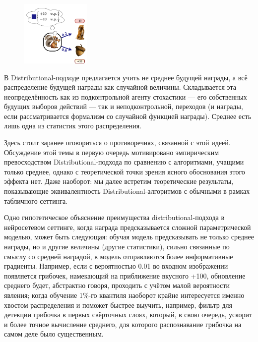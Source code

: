 \begin{figure}
\vspace{-0.3cm}
\centering
\includegraphics[width=0.3\textwidth]{Images/DistributionalRL2.png}
\vspace{-0.3cm}
\end{figure}
В Distributional-подходе предлагается учить не среднее будущей награды, а всё распределение будущей награды как случайной величины. Складывается эта неопределённость как из подконтрольной агенту стохастики --- его собственных будущих выборов действий --- так и неподконтрольной, переходов (и награды, если рассматривается формализм со случайной функцией награды). Среднее есть лишь одна из статистик этого распределения. 

Здесь стоит заранее оговориться о противоречиях, связанной с этой идеей. Обсуждение этой темы в первую очередь мотивировано эмпирическим превосходством Distributional-подхода по сравнению с алгоритмами, учащими только среднее, однако с теоретической точки зрения ясного обоснования этого эффекта нет. Даже наоборот: мы далее встретим теоретические результаты, показывающие эквивалентность Distributional-алгоритмов с обычными в рамках табличного сеттинга. 

Одно гипотетическое объяснение преимущества distributional-подхода в нейросетевом сеттинге, когда награда предсказывается сложной параметрической моделью, может быть следующая: обучая модель предсказывать не только среднее награды, но и другие величины (другие статистики), сильно связанные по смыслу со средней наградой, в модель отправляются более информативные градиенты. Например, если с вероятностью 0.01 во входном изображении появляется грибочек, намекающий на приближение вкусного +100, обновление среднего будет, абстрактно говоря, проходить с учётом малой вероятности явления; когда обучение 1\%-го квантиля наоборот крайне интересуется именно хвостом распределения и поможет быстрее выучить, например, фильтр для детекции грибочка в первых свёрточных слоях, который, в свою очередь, ускорит и более точное вычисление среднего, для которого распознавание грибочка на самом деле было существенным.

